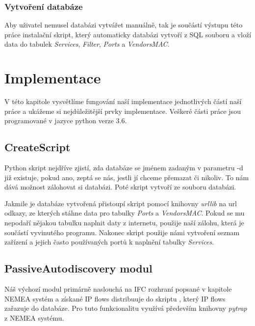 \documentclass[thesis=B,czech,hidelinks]{FITthesis}[2019/03/21]
\begin{document}
        \subsection{Vytvoření databáze}
        Aby uživatel nemusel databázi vytvářet manuálně, tak je součástí výstupu této práce instalační skript, který automaticky databázi vytvoří z SQL souboru a vloží data do tabulek \emph{Services}, \emph{Filter}, \emph{Ports} a \emph{VendorsMAC}.


\chapter{Implementace}
V této kapitole vysvětlíme fungování naší implementace jednotlivých částí naší práce a ukážeme si nejdůležitější prvky implementace. Veškeré části práce jsou programované v jazyce python verze 3.6.
    \section{CreateScript}
    Python skript  nejdříve zjistí, zda databáze se jménem zadaným v parametru -d již existuje, pokud ano, zeptá se nás, jestli jí chceme přemazat či nikoliv. To nám dává možnost zálohovat si databázi.
    Poté skript vytvoří ze souboru  databázi. 
    
    Jakmile je databáze vytvořená přistoupí skript pomocí knihovny \emph{urllib} \cite{URLLIB} na url odkazy, ze kterých stáhne data pro tabulky \emph{Ports} a \emph{VendorsMAC}. Pokud se mu nepodaří nějakou tabulku naplnit daty z internetu, použije naší zálohu, která je součástí vyvinutého programu. Nakonec skript použije námi vytvoření seznam zařízení a jejich často používaných portů k naplnění tabulky \emph{Services}.
    
    \section{PassiveAutodiscovery modul}
    Náš výchozí modul primárně naslouchá na IFC rozhraní popsané v kapitole NEMEA systém a získané IP flows distribuuje do skriptu , který IP flows zařazuje do databáze. Pro tuto funkcionalitu využívá především knihovny \emph{pytrap} \cite{NEMEA} z NEMEA systému.
    
\end{document}
